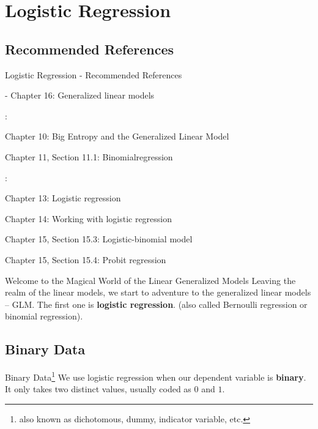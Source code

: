 \section{Logistic Regression}

\subsection{Recommended References}
\begin{frame}{Logistic Regression - Recommended References}
	\begin{vfilleditems}
		\item \textcite{gelman2013bayesian} - Chapter 16: Generalized linear models
		\item \textcite{mcelreath2020statistical}:
		\begin{vfilleditems}
			\item Chapter 10: Big Entropy and the Generalized Linear Model
			\item Chapter 11, Section 11.1: Binomialregression
		\end{vfilleditems}
		\item \textcite{gelman2020regression}:
		\begin{vfilleditems}
			\item Chapter 13: Logistic regression
			\item Chapter 14: Working with logistic regression
			\item Chapter 15, Section 15.3: Logistic-binomial model
			\item Chapter 15, Section 15.4: Probit regression
		\end{vfilleditems}
	\end{vfilleditems}
\end{frame}

\begin{frame}{Welcome to the Magical World of the Linear Generalized Models}
	Leaving the realm of the linear models,
	we start to adventure to the generalized linear models -- GLM.
	\vfill
	The first one is \textbf{logistic regression}.
	(also called Bernoulli regression or
	binomial regression).
\end{frame}

\subsection{Binary Data}
\begin{frame}{Binary Data\footnote{
			also known as dichotomous, dummy, indicator variable, etc.}
	}
	We use logistic regression when our dependent variable is \textbf{binary}.
	It only takes two distinct values,
	usually coded as $0$ and $1$.
\end{frame}

